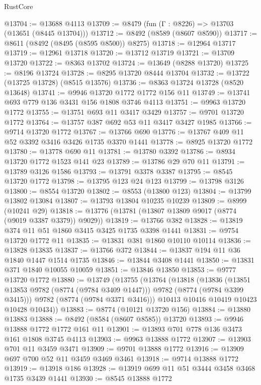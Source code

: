 \begin{lexlean}{RustCore}
\begin{coremodule}
@13704 := @13688 @4113
@13709 := @8479 (fun (Γ : @8226) => @13703 (@13651 (@8445 @13704)))
@13712 := @8492 (@8589 (@8607 @8590))
@13717 := @8611 (@8492 (@8495 (@8595 @8500)) @8275)
@13718 := @12964 @13717
@13719 := @12961 @13718
@13720 := @13712 @13719
@13721 := @13709 @13720
@13722 := @8363 @13702
@13724 := @13649 (@8288 @13720)
@13725 := @8196 @13724
@13728 := @8295 @13720 @8444 @13704
@13732 := @13722 (@13725 @13728) (@8515 @13576)
@13736 := @8363 @13724 @13728 (@8520 @13648)
@13741 := @9946 @13720 @1772 @1772 @156 @11
@13749 := @13741 @693 @779 @136 @3431 @156 @1808 @3746 @4113
@13751 := @9963 @13720 @1772
@13755 := @13751 @693 @11 @3417 @3429
@13757 := @9701 @13720 @1772
@13764 := @13757 @387 @692 @53 @11 @3417 @3427 @1985
@13766 := @9714 @13720 @1772
@13767 := @13766 @690
@13776 := @13767 @409 @11 @52 @3392 @3416 @3426 @1735 @3370 @1441
@13778 := @8925 @13720 @1772
@13780 := @13778 @690 @11
@13781 := @13780 @3392
@13786 := @8934 @13720 @1772 @1523 @141 @23
@13789 := @13786 @29 @70 @11
@13791 := @13789 @3126 @1586
@13793 := @13791 @3378 @3387
@13795 := @8545 @13720 @1772
@13798 := @13795 @123 @24 @123
@13799 := @13798 @3126
@13800 := @8554 @13720
@13802 := @8553 (@13800 @123)
@13804 := @13799 @13802 @13084
@13807 := @13793 @13804 @10235 @10239
@13809 := @8999 (@10241 @29)
@13818 := @13776 (@13781 (@13807 @13809 @9017 (@8774 (@9019 @3387 @3379)) @9029))
@13819 := @13766 @382
@13828 := @13819 @374 @11 @51 @1860 @3415 @3425 @1735 @3398 @1441
@13831 := @9754 @13720 @1772 @11
@13835 := @13831 @381 @1860 @10110 @10114
@13836 := @13828 @13835
@13837 := @13766 @372
@13844 := @13837 @194 @11 @36 @1840 @1447 @1514 @1735
@13846 := @13844 @3408 @1441
@13850 := @13831 @371 @1840 @10055 @10059
@13851 := @13846 @13850
@13853 := @9777 @13720 @1772
@13880 := @13749
    (@13755
      (@13764
        (@13818
          (@13836
            (@13851 @13853 @9782 (@8774 (@9784 @3409 @1447)))
            @9782
            (@8774 (@9784 @3399 @3415)))
          @9782
          (@8774 (@9784 @3371 @3416)))
        @10413
        @10416
        @10419
        @10423
        @10428
        @10434))
@13883 := @8774 (@10121 @13720 @156)
@13884 := @13880 @13883
@13888 := @8492 (@8584 (@8607 @8585)) @13720
@13893 := @9946 @13888 @1772 @1772 @161 @11
@13901 := @13893 @701 @778 @136 @3473 @161 @1808 @3745 @4113
@13903 := @9963 @13888 @1772
@13907 := @13903 @701 @11 @3459 @3471
@13909 := @9701 @13888 @1772
@13916 := @13909 @697 @700 @52 @11 @3459 @3469 @3461
@13918 := @9714 @13888 @1772
@13919 := @13918 @186
@13928 := @13919 @699 @11 @51 @3444 @3458 @3468 @1735 @3439 @1441
@13930 := @8545 @13888 @1772

\end{coremodule}
\end{lexlean}
